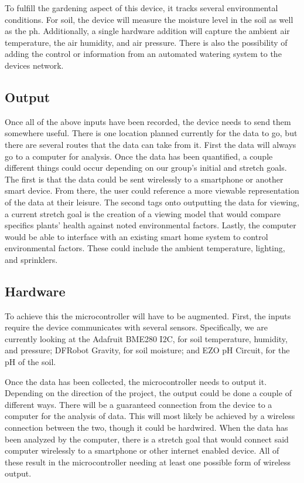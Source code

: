 \documentclass[IEEEtran,letterpaper,10pt,titlepage,fleqn,draftclsnofoot,onecolumn]{article}
\begin{document}
To fulfill the gardening aspect of this device, it tracks several environmental conditions. For soil, the device will measure the moisture level in the soil as well as the ph. Additionally, a single hardware addition will capture the ambient air temperature, the air humidity, and air pressure. There is also the possibility of adding the control or information from an automated watering system to the devices network.

\subsection{Output}

Once all of the above inputs have been recorded, the device needs to send them somewhere useful. There is one location planned currently for the data to go, but there are several routes that the data can take from it. First the data will always go to a computer for analysis. Once the data has been quantified, a couple different things could occur depending on our group’s initial and stretch goals. The first is that the data could be sent wirelessly to a smartphone or another smart device. From there, the user could reference a more viewable representation of the data at their leisure. The second tags onto outputting the data for viewing, a current stretch goal is the creation of a viewing model that would compare specifics plants’ health against noted environmental factors. Lastly, the computer would be able to interface with an existing smart home system to control environmental factors. These could include the ambient temperature, lighting, and sprinklers.

\subsection{Hardware}

To achieve this the microcontroller will have to be augmented. First, the inputs require the device communicates with several sensors. Specifically, we are currently looking at the Adafruit BME280 I2C, for soil temperature, humidity, and pressure; DFRobot Gravity, for soil moisture; and EZO pH Circuit, for the pH of the soil.

\vspace{5mm}

Once the data has been collected, the microcontroller needs to output it. Depending on the direction of the project, the output could be done a couple of different ways. There will be a guaranteed connection from the device to a computer for the analysis of data. This will most likely be achieved by a wireless connection between the two, though it could be hardwired. When the data has been analyzed by the computer, there is a stretch goal that would connect said computer wirelessly to a smartphone or other internet enabled device. All of these result in the microcontroller needing at least one possible form of wireless output.
\end{document}
